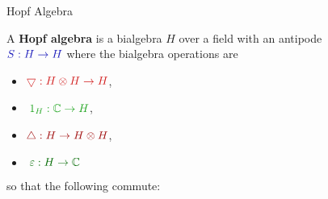 \documentclass{beamer}
\begin{document}
\begin{frame}[fragile]{Hopf Algebra}

A \textbf{Hopf algebra} is a bialgebra $H$ over a field with an antipode \\\;\;\;\;\;\;\;\;$\color{darkblue}S:H\to H$ \;\;\;where the bialgebra operations are 
\vspace{-2ex}
\begin{multicols}{2}
\begin{itemize}
\item[]<2->$\color{lightred}\bigtriangledown:H\otimes H\to H$, 
\item[]<3->$\color{lightgreen}\;1_H:\mathbb{C}\to H$, 
\item[]<4->$\color{darkred}\triangle:H\to H\otimes H$, 
\item[]<5->$\color{darkgreen}\;\varepsilon:H\to\mathbb{C}$
\end{itemize}
\end{multicols}
\vspace{-2ex}
\pause so that the following commute:


\end{frame}
\end{document}
